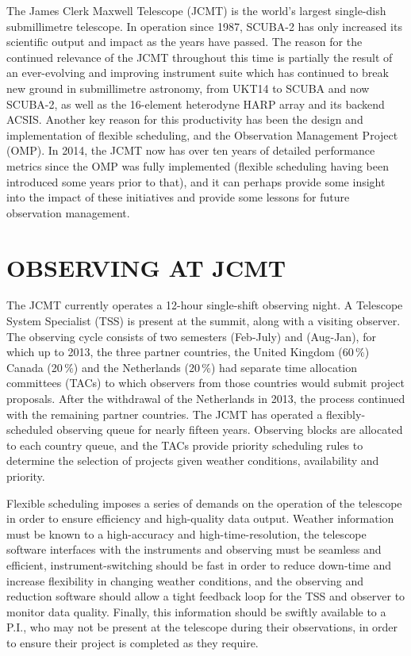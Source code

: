 \documentclass[]{spie}  %
\begin{document}
The James Clerk Maxwell Telescope (JCMT) is the world's largest
single-dish submillimetre telescope. In operation since 1987, SCUBA-2
has only increased its scientific output and impact as the years have
passed. The reason for the continued relevance of the JCMT throughout
this time is partially the result of an ever-evolving and improving
instrument suite which has continued to break new ground in
submillimetre astronomy, from UKT14\cite{1990MNRAS.243..126D} to SCUBA\cite{holland1999}
and now SCUBA-2\cite{holland2013}, as well as the 16-element heterodyne
HARP array\cite{buckle} and its backend ACSIS\cite{2000SPIE.4015..114H}. Another key
reason for this productivity has been the design and implementation of
flexible scheduling\cite{1998SPIE.3349..126W,tilanus2000,robson2002}, and the Observation
Management Project (OMP)\cite{economou2002}.  In 2014, the JCMT now
has over ten years of detailed performance metrics since the OMP was
fully implemented (flexible scheduling having been introduced some
years prior to that), and it can perhaps provide some insight into the
impact of these initiatives and provide some lessons for future
observation management.


\section{OBSERVING AT JCMT}

The JCMT currently operates a 12-hour single-shift observing night. A
Telescope System Specialist (TSS) is present at the summit, along with
a visiting observer. The observing cycle consists of two semesters
(Feb-July) and (Aug-Jan), for which up to 2013, the three partner
countries, the United Kingdom (60\,$\%$) Canada (20\,$\%$) and the
Netherlands (20\,$\%$) had separate time allocation committees (TACs) to
which observers from those countries would submit project
proposals. After the withdrawal of the Netherlands in 2013, the
process continued with the remaining partner countries. The JCMT has
operated a flexibly-scheduled observing queue for nearly fifteen
years. Observing blocks are allocated to each country queue, and the
TACs provide priority scheduling rules to determine the selection of
projects given weather conditions, availability and priority.

Flexible scheduling imposes a series of demands on the operation of
the telescope in order to ensure efficiency and high-quality data
output. Weather information must be known to a high-accuracy and
high-time-resolution, the telescope software interfaces with the
instruments and observing must be seamless and efficient,
instrument-switching should be fast in order to reduce down-time and
increase flexibility in changing weather conditions, and the observing
and reduction software should allow a tight feedback loop for the TSS
and observer to monitor data quality. Finally, this information should
be swiftly available to a P.I., who may not be present at the telescope
during their observations, in order to ensure their project is
completed as they require.
\end{document}
